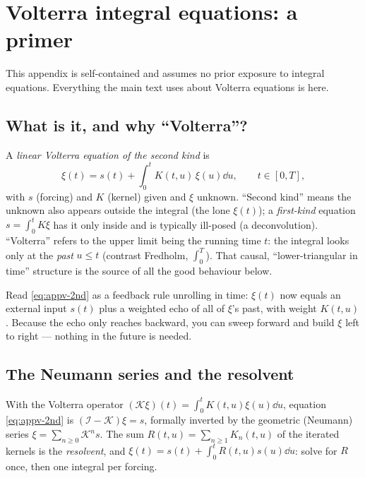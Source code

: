 \chapter{Volterra integral equations: a primer}
\label{app:volterra}

This appendix is self-contained and assumes no prior exposure to integral
equations. Everything the main text uses about Volterra equations is here.

\section{What is it, and why ``Volterra''?}

A \emph{linear Volterra equation of the second kind} is
\begin{equation}
\xi(t)=s(t)+\int_0^t K(t,u)\,\xi(u)\dd u,\qquad t\in[0,T],
\label{eq:appv-2nd}
\end{equation}
with $s$ (forcing) and $K$ (kernel) given and $\xi$ unknown. ``Second kind'' means
the unknown also appears outside the integral (the lone $\xi(t)$); a
\emph{first-kind} equation $s=\int_0^t K\xi$ has it only inside and is typically
ill-posed (a deconvolution). ``Volterra'' refers to the upper limit being the
running time $t$: the integral looks only at the \emph{past} $u\le t$ (contrast
Fredholm, $\int_0^T$). That causal, ``lower-triangular in time'' structure is the
source of all the good behaviour below.

\begin{intuitionbox}
Read \eqref{eq:appv-2nd} as a feedback rule unrolling in time: $\xi(t)$ now equals
an external input $s(t)$ plus a weighted echo of all of $\xi$'s past, with weight
$K(t,u)$. Because the echo only reaches backward, you can sweep forward and build
$\xi$ left to right --- nothing in the future is needed.
\end{intuitionbox}

\section{The Neumann series and the resolvent}

With the Volterra operator $(\mathcal K\xi)(t)=\int_0^t K(t,u)\xi(u)\dd u$,
equation \eqref{eq:appv-2nd} is $(\mathcal I-\mathcal K)\xi=s$, formally inverted by
the geometric (Neumann) series
$\xi=\sum_{n\ge0}\mathcal K^n s$. The sum
$R(t,u)=\sum_{n\ge1}K_n(t,u)$ of the iterated kernels is the \emph{resolvent}, and
$\xi(t)=s(t)+\int_0^t R(t,u)s(u)\dd u$: solve for $R$ once, then one integral per
forcing.

